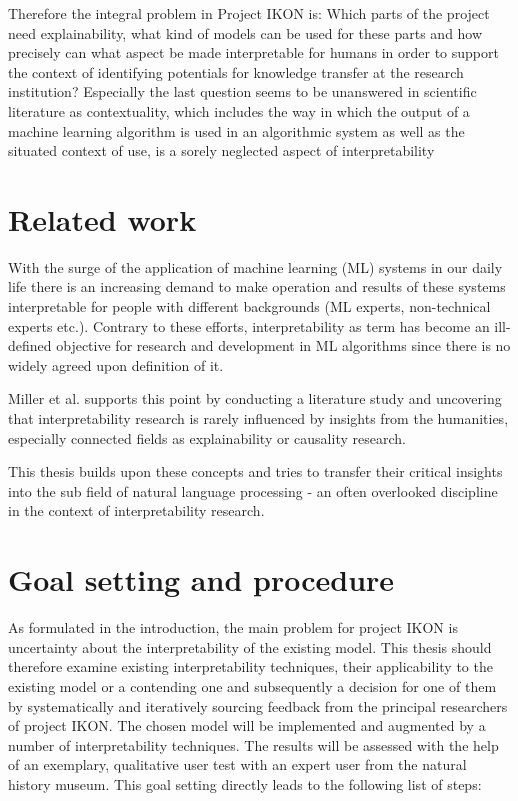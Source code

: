 \documentclass[pdftex,a4paper,12pt]{scrartcl}
\begin{document}
Therefore the integral problem in Project IKON is: Which parts of the project need explainability, what kind of models can be used for these parts and how precisely can what aspect be made interpretable for humans in order to support the context of identifying potentials for knowledge transfer at the research institution? Especially the last question seems to be unanswered in scientific literature as contextuality, which includes the way in which the output of a machine learning algorithm is used in an algorithmic system as well as the situated context of use, is a sorely neglected aspect of interpretability \cite{millerExplanationArtificialIntelligence2017}

\section{Related work}

With the surge of the application of machine learning (ML) systems in our daily life there is an increasing demand to make operation and results of these systems interpretable for people with different backgrounds (ML experts, non-technical experts etc.). Contrary to these efforts, interpretability as term has become an ill-defined objective \cite{liptonMythosModelInterpretability2016}  for research and development in ML algorithms since there is no widely agreed upon definition of it. 

Miller et al. \cite{millerExplainableAIBeware2017} supports this point by conducting a literature study and uncovering that interpretability research is rarely influenced by insights from the humanities, especially connected fields as explainability or causality research.

This thesis builds upon these concepts  and tries to transfer their critical insights into the sub field of natural language processing - an often overlooked discipline in the context of interpretability research.

\section{Goal setting and procedure} 
As formulated in the introduction, the main problem for project IKON is uncertainty about the interpretability of the existing model. This thesis should therefore examine existing interpretability techniques, their applicability to the existing model or a contending one and subsequently a decision for one of them by systematically and iteratively sourcing feedback from the principal researchers of project IKON. The chosen model will be implemented and augmented by a number of interpretability techniques. The results will be assessed with the help of an exemplary, qualitative user test with an expert user from the natural history museum. This goal setting directly leads to the following list of steps:
\end{document}
